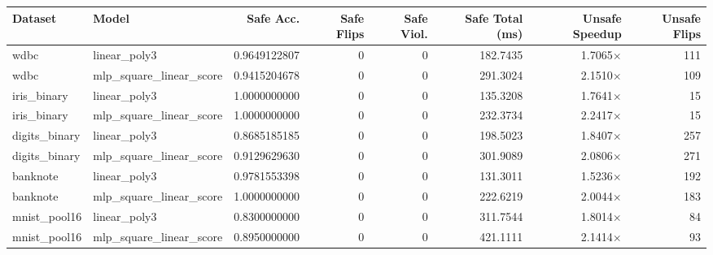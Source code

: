\begin{tabular}{llrrrrrr}
\toprule
Dataset & Model & Safe Acc. & Safe Flips & Safe Viol. & Safe Total (ms) & Unsafe Speedup & Unsafe Flips \\
\midrule
wdbc & linear\_poly3 & 0.9649122807 & 0 & 0 & 182.7435 & 1.7065$\times$ & 111 \\
wdbc & mlp\_square\_linear\_score & 0.9415204678 & 0 & 0 & 291.3024 & 2.1510$\times$ & 109 \\
iris\_binary & linear\_poly3 & 1.0000000000 & 0 & 0 & 135.3208 & 1.7641$\times$ & 15 \\
iris\_binary & mlp\_square\_linear\_score & 1.0000000000 & 0 & 0 & 232.3734 & 2.2417$\times$ & 15 \\
digits\_binary & linear\_poly3 & 0.8685185185 & 0 & 0 & 198.5023 & 1.8407$\times$ & 257 \\
digits\_binary & mlp\_square\_linear\_score & 0.9129629630 & 0 & 0 & 301.9089 & 2.0806$\times$ & 271 \\
banknote & linear\_poly3 & 0.9781553398 & 0 & 0 & 131.3011 & 1.5236$\times$ & 192 \\
banknote & mlp\_square\_linear\_score & 1.0000000000 & 0 & 0 & 222.6219 & 2.0044$\times$ & 183 \\
mnist\_pool16 & linear\_poly3 & 0.8300000000 & 0 & 0 & 311.7544 & 1.8014$\times$ & 84 \\
mnist\_pool16 & mlp\_square\_linear\_score & 0.8950000000 & 0 & 0 & 421.1111 & 2.1414$\times$ & 93 \\
\bottomrule
\end{tabular}
